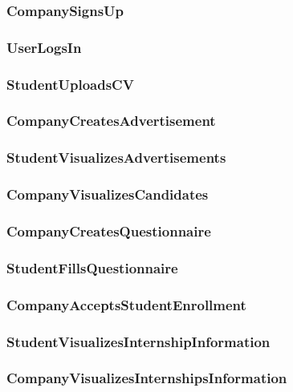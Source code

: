 \subsubsection{CompanySignsUp}

\subsubsection{UserLogsIn}

\subsubsection{StudentUploadsCV}

\subsubsection{CompanyCreatesAdvertisement}

\subsubsection{StudentVisualizesAdvertisements}

\subsubsection{CompanyVisualizesCandidates}

\subsubsection{CompanyCreatesQuestionnaire}

\subsubsection{StudentFillsQuestionnaire}

\subsubsection{CompanyAcceptsStudentEnrollment}

\subsubsection{StudentVisualizesInternshipInformation}

\subsubsection{CompanyVisualizesInternshipsInformation}

